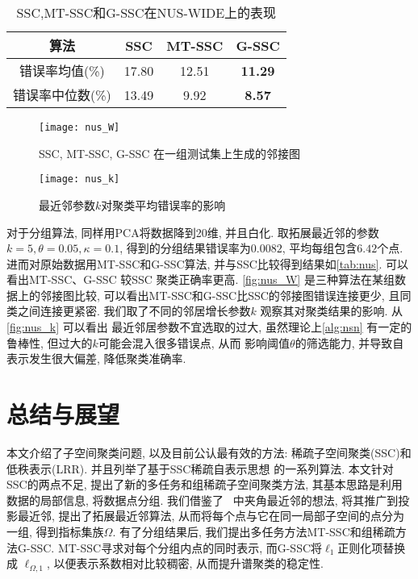\begin{table}[tb]
  \centering
  \begin{tabular}{|c | c | c | c |}
	\hline
	  算法 & SSC & MT-SSC & G-SSC \\	\hline  \hline
      错误率均值(\%) & 17.80 & 12.51 & \textbf{11.29} \\	\hline
      错误率中位数(\%) & 13.49 & 9.92 & \textbf{8.57} \\	\hline
  \end{tabular}
  \caption{SSC,MT-SSC和G-SSC在NUS-WIDE上的表现}
  \label{tab:nus}
\end{table}
\begin{figure}[t]
  \centering
  \texttt{[image: nus\_W]}
  \caption{SSC, MT-SSC, G-SSC 在一组测试集上生成的邻接图}
  \label{fig:nus_W}
\end{figure}
\begin{figure}[t!]
  \centering
  \texttt{[image: nus\_k]}
  \caption{最近邻参数\(k\)对聚类平均错误率的影响}
  \label{fig:nus_k}
\end{figure}
对于分组算法, 同样用PCA将数据降到20维, 并且白化.
取拓展最近邻的参数\(k=5, \theta=0.05, \kappa=0.1\),
得到的分组结果错误率为\(0.0082\), 平均每组包含\(6.42\)个点.
进而对原始数据用MT-SSC和G-SSC算法,
并与SSC比较得到结果如\autoref{tab:nus}.
可以看出MT-SSC、G-SSC 较SSC 聚类正确率更高.
\autoref{fig:nus_W} 是三种算法在某组数据上的邻接图比较,
可以看出MT-SSC和G-SSC比SSC的邻接图错误连接更少,
且同类之间连接更紧密. 我们取了不同的邻居增长参数\(k\)
观察其对聚类结果的影响. 从\autoref{fig:nus_k} 可以看出
最近邻居参数不宜选取的过大, 虽然理论上\autoref{alg:nsn} 
有一定的鲁棒性, 但过大的\(k\)可能会混入很多错误点, 从而
影响阈值\(\theta\)的筛选能力, 并导致自表示发生很大偏差,
降低聚类准确率.

\chapter{总结与展望}
本文介绍了子空间聚类问题, 以及目前公认最有效的方法:
稀疏子空间聚类(SSC)和低秩表示(LRR). 并且列举了基于SSC稀疏自表示思想
的一系列算法. 本文针对SSC的两点不足, 提出了新的多任务和组稀疏子空间聚类方法,
其基本思路是利用数据的局部信息, 将数据点分组. 我们借鉴了~\cite{heckel2013noisy}
中夹角最近邻的想法, 将其推广到投影最近邻, 提出了拓展最近邻算法,
从而将每个点与它在同一局部子空间的点分为一组, 得到指标集族\(\Omega\).
有了分组结果后, 我们提出多任务方法MT-SSC和组稀疏方法G-SSC.
MT-SSC寻求对每个分组内点的同时表示, 而G-SSC将\(\ell_1\)正则化项替换成
\(\ell_{\Omega, 1}\), 以便表示系数相对比较稠密, 从而提升谱聚类的稳定性.

